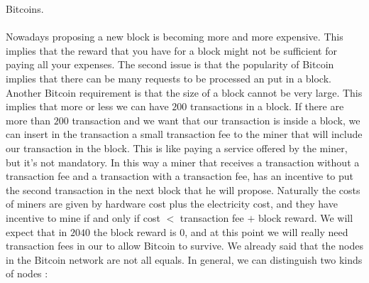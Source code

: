 Bitcoins.\\\\Nowadays proposing a new block is becoming more and more expensive. This implies that the reward that you have for a block might not be sufficient for paying all your expenses. The second issue is that the popularity of Bitcoin implies that there can be many requests to be processed an put in a block. Another Bitcoin requirement is that the size of a block cannot be very large. This implies that more or less we can have $200$ transactions in a block. If there are more than $200$ transaction and we want that our transaction is inside a block, we can insert in the transaction a small transaction fee to the miner that will include our transaction in the block. This is like paying a service offered by the miner, but it's not mandatory. In this way a miner that receives a transaction without a transaction fee and a transaction with a transaction fee, has an incentive to put the second transaction in the next block that he will propose. Naturally the costs of miners are given by hardware cost plus the electricity cost, and they have incentive to mine if and only if cost $<$ transaction fee $+$ block reward. We will expect that in $2040$ the block reward is $0$, and at this point we will really need transaction fees in our to allow Bitcoin to survive. We already said that the nodes in the Bitcoin network are not all equals. In general, we can distinguish two kinds of nodes :
